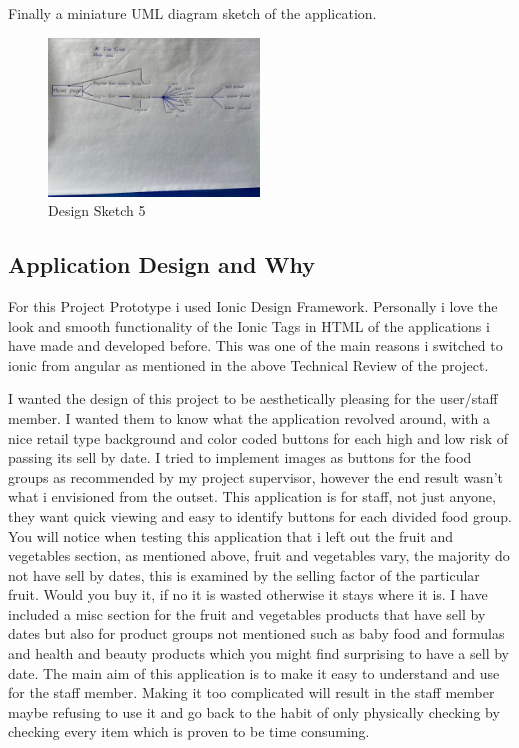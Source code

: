 Finally a miniature UML diagram sketch of the application. 

\begin{figure}[h!]
	\caption{Design Sketch 5}
	\label{image:sketch5}
	\centering
	\includegraphics[width=0.5\textwidth]{images/sketch5.jpg}
\end{figure}
\newpage

\subsection{Application Design and Why}
For this Project Prototype i used Ionic Design Framework. Personally i love the look and smooth functionality of the Ionic Tags in HTML of the applications i have made and developed before. This was one of the main reasons i switched to ionic from angular as mentioned in the above Technical Review of the project. 
\newline

I wanted the design of this project to be aesthetically pleasing for the user/staff member. I wanted them to know what the application revolved around, with a nice retail type background and color coded buttons for each high and low risk of passing its sell by date. I tried to implement images as buttons for the food groups as recommended by my project supervisor, however the end result wasn't what i envisioned from the outset. This application is for staff, not just anyone, they want quick viewing and easy to identify buttons for each divided food group. You will notice when testing this application that i left out the fruit and vegetables section, as mentioned above, fruit and vegetables vary, the majority do not have sell by dates, this is examined by the selling factor of the particular fruit. Would you buy it, if no it is wasted otherwise it stays where it is. I have included a misc section for the fruit and vegetables products that have sell by dates but also for product groups not mentioned such as baby food and formulas and health and beauty products which you might find surprising to have a sell by date. The main aim of this application is to make it easy to understand and use for the staff member. Making it too complicated will result in the staff member maybe refusing to use it and go back to the habit of only physically checking by checking every item which is proven to be time consuming.
\newline

